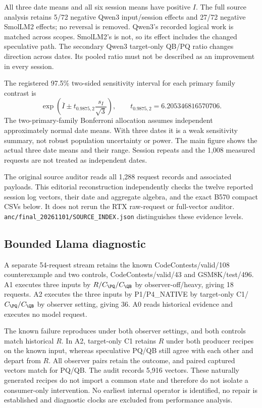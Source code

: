 All three date means and all six session means have positive $I$. The full source analysis retains 5/72 negative Qwen3 input/session effects and 27/72 negative SmolLM2 effects; no reversal is removed. Qwen3's recorded logical work is matched across scopes. SmolLM2's is not, so its effect includes the changed speculative path. The secondary Qwen3 target-only QB/PQ ratio changes direction across dates. Its pooled ratio must not be described as an improvement in every session.

The registered 97.5\% two-sided sensitivity interval for each primary family contrast is
\[
\exp\!\left(\overline I\pm t_{0.9875,2}\frac{s_I}{\sqrt3}\right),
\qquad t_{0.9875,2}=6.205346816570706.
\]
The two-primary-family Bonferroni allocation assumes independent approximately normal date means. With three dates it is a weak sensitivity summary, not robust population uncertainty or power. The main figure shows the actual three date means and their range. Session repeats and the 1,008 measured requests are not treated as independent dates.

The original source auditor reads all 1,288 request records and associated payloads. This editorial reconstruction independently checks the twelve reported session log vectors, their date and aggregate algebra, and the exact B570 compact CSVs below. It does not rerun the RTX raw-request or full-vector auditor. \texttt{anc/final\_20261101/SOURCE\_INDEX.json} distinguishes these evidence levels.

\subsection{Bounded Llama diagnostic}
\label{supp:finaldiagnostic}
A separate 54-request stream retains the known CodeContests/valid/108 counterexample and two controls, CodeContests/valid/43 and GSM8K/test/496. A1 executes three inputs by $R/C_{\PQ}/C_{\QB}$ by observer-off/heavy, giving 18 requests. A2 executes the three inputs by P1/P4\_NATIVE by target-only C1/$C_{\PQ}/C_{\QB}$ by observer setting, giving 36. A0 reads historical evidence and executes no model request.

The known failure reproduces under both observer settings, and both controls match historical $R$. In A2, target-only C1 retains $R$ under both producer recipes on the known input, whereas speculative PQ/QB still agree with each other and depart from $R$. All observer pairs retain the outcome, and paired captured vectors match for PQ/QB. The audit records 5,916 vectors. These naturally generated recipes do not import a common state and therefore do not isolate a consumer-only intervention. No earliest internal operator is identified, no repair is established and diagnostic clocks are excluded from performance analysis.

